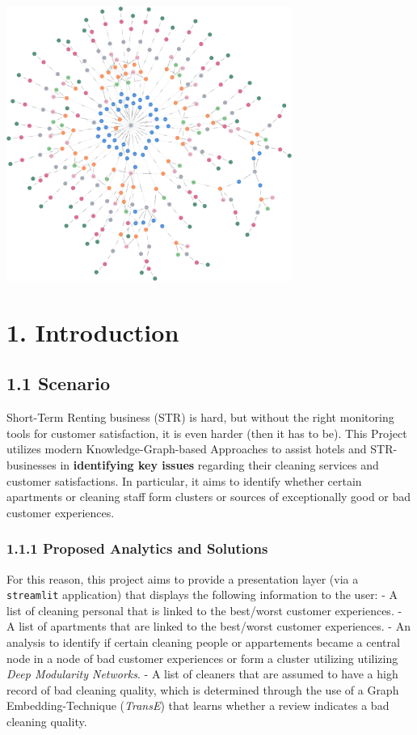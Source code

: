 \documentclass[
]{article}
\author{}
\date{}
\begin{document}
\begin{center}
  \includegraphics[width=0.7\textwidth]{drawings/graph_fully_con.png}
\end{center}


\section{1. Introduction}\label{introduction}

\subsection{1.1 Scenario}\label{scenario}

Short-Term Renting business (STR) is hard, but without the right
monitoring tools for customer satisfaction, it is even harder (then it
has to be). This Project utilizes modern Knowledge-Graph-based
Approaches to assist hotels and STR-businesses in \textbf{identifying
key issues} regarding their cleaning services and customer
satisfactions. In particular, it aims to identify whether certain
apartments or cleaning staff form clusters or sources of exceptionally
good or bad customer experiences.

\subsubsection{1.1.1 Proposed Analytics and
Solutions}\label{proposed-analytics-and-solutions}

For this reason, this project aims to provide a presentation layer (via
a \texttt{streamlit} application) that displays the following
information to the user: - A list of cleaning personal that is linked to
the best/worst customer experiences. - A list of apartments that are
linked to the best/worst customer experiences. - An analysis to identify
if certain cleaning people or appartements became a central node in a
node of bad customer experiences or form a cluster utilizing utilizing
\emph{Deep Modularity Networks}. - A list of cleaners that are assumed
to have a high record of bad cleaning quality, which is determined
through the use of a Graph Embedding-Technique (\emph{TransE}) that
learns whether a review indicates a bad cleaning quality.
\end{document}
